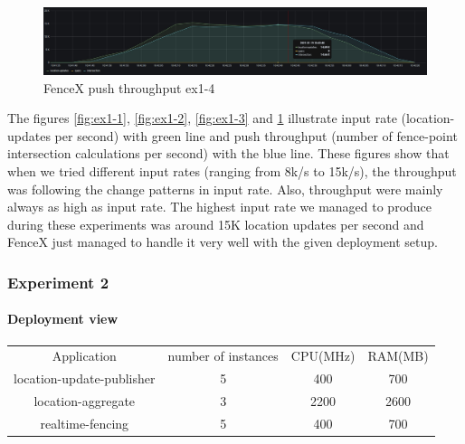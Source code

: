 \documentclass[a4]{report}
\begin{document}
        \begin{figure}[ht]
            \caption{FenceX push throughput ex1-4}
            \label{fig:ex1-4}
            \includegraphics[scale=0.4]{images/evaluation/ex1-benchmarking(23,10).png}
        \end{figure}

        The figures \ref{fig:ex1-1}, \ref{fig:ex1-2}, \ref{fig:ex1-3} and \ref{fig:ex1-4} illustrate input rate
        (location-updates per second) with green line and push throughput (number of fence-point intersection
        calculations per second) with the blue line.
        These figures show that when we tried different input rates (ranging from 8k/s to 15k/s), the throughput was
        following the change patterns in input rate.
        Also, throughput were mainly always as high as input rate.
        The highest input rate we managed to produce during these experiments was around 15K location updates per second
        and FenceX just managed to handle it very well with the given deployment setup.

        \clearpage

        \subsubsection{Experiment 2}

        \paragraph{Deployment view}
        \begin{center}
            \begin{tabular}{ c c c c }
                Application               & number of instances & CPU(MHz) & RAM(MB) \\
                location-update-publisher & 5                   & 400      & 700     \\
                location-aggregate        & 3                   & 2200     & 2600    \\
                realtime-fencing          & 5                   & 400      & 700     \\
            \end{tabular}
        \end{center}
\end{document}
